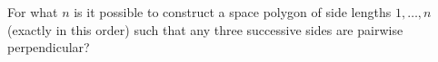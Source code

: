 For what $n$ is it possible to construct a space polygon of side lengths $1, \ldots, n$ (exactly in this order) such that any three successive sides are pairwise perpendicular?
